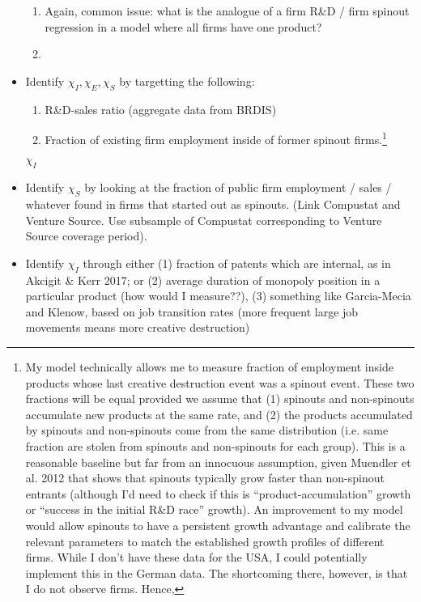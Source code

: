 \documentclass[12pt,english]{article}
\theoremstyle{remark}
\begin{document}
\begin{itemize}
	\begin{enumerate}
		\item Again, common issue: what is the analogue of a firm R\&D / firm spinout regression in a model where all firms have one product?
		\item  
	\end{enumerate}
	\item Identify $\chi_I,\chi_E,\chi_S$ by targetting the following:
	\begin{enumerate}
		\item R\&D-sales ratio (aggregate data from BRDIS)
		\item Fraction of existing firm employment inside of former spinout firms.\footnote{My model technically allows me to measure fraction of employment inside products whose last creative destruction event was a spinout event. These two fractions will be equal provided we assume that (1) spinouts and non-spinouts accumulate new products at the same rate, and (2) the products accumulated by spinouts and non-spinouts come from the same distribution (i.e. same fraction are stolen from spinouts and non-spinouts for each group). This is a reasonable baseline but far from an innocuous assumption, given Muendler et al. 2012 that shows that spinouts typically grow faster than non-spinout entrants (although I'd need to check if this is ``product-accumulation'' growth or ``success in the initial R\&D race'' growth). An improvement to my model would allow spinouts to have a persistent growth advantage and calibrate the relevant parameters to match the established growth profiles of different firms. While I don't have these data for the USA, I could potentially implement this in the German data. The shortcoming there, however, is that I do not observe firms. Hence, }
	\end{enumerate} $\chi_I$ 
	\item Identify $\chi_S$ by looking at the fraction of public firm employment / sales / whatever found in firms that started out as spinouts. (Link Compustat and Venture Source. Use subsample of Compustat corresponding to Venture Source coverage period).
	\item Identify $\chi_I$ through either (1) fraction of patents which are internal, as in Akcigit \& Kerr 2017; or (2) average duration of monopoly position in a particular product (how would I measure??), (3) something like Garcia-Mecia and Klenow, based on job transition rates (more frequent large job movements means more creative destruction)


\end{itemize}
\end{document}
